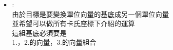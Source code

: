 \documentclass[../main.tex]{subfiles}
\begin{document}
\begin{itemize}
\begin{itemize}
\begin{enumerate}
\begin{equation}
            \left(\frac{\partial}{\partial z}\right)_{xy} = \left(\frac{\partial}{\partial z}\right)_{r\theta}
          \end{equation}
      \end{enumerate}
      整理如下:
      \begin{equation}
        \boxed{
        \begin{cases}
          \left(\frac{\partial}{\partial x}\right)_{yz} = \cos\theta \left(\frac{\partial}{\partial r}\right)_{\theta z}
          - \frac{\sin\theta}{r}\left(\frac{\partial}{\partial \theta}\right)_{rz} \\
          \left(\frac{\partial}{\partial y}\right)_{xz} = \sin\theta \left(\frac{\partial}{\partial r}\right)_{\theta z}
          + \frac{\cos\theta}{r}\left(\frac{\partial}{\partial \theta}\right)_{rz} \\
          \left(\frac{\partial}{\partial z}\right)_{xy} = \left(\frac{\partial}{\partial z}\right)_{r\theta}
        \end{cases}
        } \label{eq:cylindrical_partial_transform}
      \end{equation}
      P.S. 另外注意到這和圓柱座標卡氏座標的Jacobian matrix是互相轉置的關係。\\
      觀察每一項會發現就是上面所在計算的偏微分\\
      用直的把每項收集起來，就分別是$\frac{\partial }{\partial x},\frac{\partial }{\partial y},\frac{\partial }{\partial z}$
      \begin{equation}
        J^{-1} = \frac{\partial (r,\theta,z)}{\partial (x,y,z)} = \begin{bmatrix}
          \frac{\partial r}{\partial x} & \frac{\partial r}{\partial y} & \frac{\partial r}{\partial z} \\
          \frac{\partial \theta}{\partial x} & \frac{\partial \theta}{\partial y} & \frac{\partial \theta}{\partial z} \\
          \frac{\partial z}{\partial x} & \frac{\partial z}{\partial y} & \frac{\partial z}{\partial z}
        \end{bmatrix}
      \end{equation}
    \item {}:\\
      由於目標是要變換單位向量的基底成另一個單位向量\\
      並希望可以做所有卡氏座標下介紹的運算\\
      這組基底必須要是\\
      1.，2.的向量，3.的向量組合\\

\end{itemize}
\end{itemize}
\end{document}
